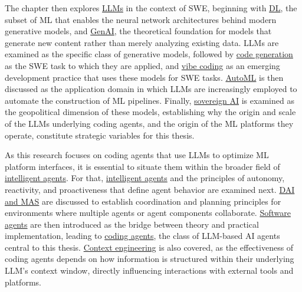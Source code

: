 \documentclass[
english,                 %
bibtex,                  %
]{kththesis}
\numberwithin{listing}{chapter}
\begin{document}
The chapter then explores \hyperref[sec:bg_llm]{\glspl{LLM}} in the context of \gls{SWE}, beginning with \hyperref[sec:bg_dl]{\gls{DL}}, the subset of \gls{ML} that enables the neural network architectures behind modern generative models, and \hyperref[sec:bg_genai]{\gls{GenAI}}, the theoretical foundation for models that generate new content rather than merely analyzing existing data. \Glspl{LLM} are examined as the specific class of generative models, followed by \hyperref[sec:bg_codegen]{code generation} as the \gls{SWE} task to which they are applied, and \hyperref[sec:bg_vibe_coding]{vibe coding} as an emerging development practice that uses these models for \gls{SWE} tasks. \hyperref[sec:bg_automated_machine_learning]{\Gls{AutoML}} is then discussed as the application domain in which \glspl{LLM} are increasingly employed to automate the construction of \gls{ML} pipelines. Finally, \hyperref[sec:bg_sovereign_artificial_intelligence]{sovereign \gls{AI}} is examined as the geopolitical dimension of these models, establishing why the origin and scale of the \glspl{LLM} underlying coding agents, and the origin of the \gls{ML} platforms they operate, constitute strategic variables for this thesis.

As this research focuses on coding agents that use \glspl{LLM} to optimize \gls{ML} platform interfaces, it is essential to situate them within the broader field of \hyperref[sec:bg_agents]{intelligent agents}. For that, \hyperref[sec:bg_intelligent_agents]{intelligent agents} and the principles of autonomy, reactivity, and proactiveness that define agent behavior are examined next. \hyperref[sec:bg_distributed_artificial_intelligence]{\Gls{DAI} and \gls{MAS}} are discussed to establish coordination and planning principles for environments where multiple agents or agent components collaborate. \hyperref[sec:bg_software_agents]{Software agents} are then introduced as the bridge between theory and practical implementation, leading to \hyperref[sec:bg_coding_agents]{coding agents}, the class of \gls{LLM}-based \gls{AI} agents central to this thesis. \hyperref[sec:bg_context_engineering]{Context engineering} is also covered, as the effectiveness of coding agents depends on how information is structured within their underlying \gls{LLM}'s context window, directly influencing interactions with external tools and platforms.
\end{document}
